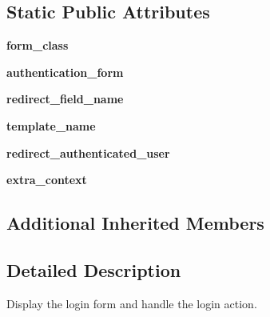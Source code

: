 \subsection*{Static Public Attributes}
\begin{DoxyCompactItemize}
\item 
\mbox{\label{classdjango_1_1contrib_1_1auth_1_1views_1_1_login_view_a97107bf1bbdc16f231a70c8871df00ea}} 
{\bfseries form\+\_\+class}
\item 
\mbox{\label{classdjango_1_1contrib_1_1auth_1_1views_1_1_login_view_a51928766c8e97abc4a82af82711fc81f}} 
{\bfseries authentication\+\_\+form}
\item 
\mbox{\label{classdjango_1_1contrib_1_1auth_1_1views_1_1_login_view_a699c8d982f292bc69a019241a828a9b0}} 
{\bfseries redirect\+\_\+field\+\_\+name}
\item 
\mbox{\label{classdjango_1_1contrib_1_1auth_1_1views_1_1_login_view_afae62f3a18cf0cc321d0d20778a044fb}} 
{\bfseries template\+\_\+name}
\item 
\mbox{\label{classdjango_1_1contrib_1_1auth_1_1views_1_1_login_view_a4b18775121675d6dddba399738c1a508}} 
{\bfseries redirect\+\_\+authenticated\+\_\+user}
\item 
\mbox{\label{classdjango_1_1contrib_1_1auth_1_1views_1_1_login_view_a86d85d7f64f6954f9ebafc687e4f2641}} 
{\bfseries extra\+\_\+context}
\end{DoxyCompactItemize}
\subsection*{Additional Inherited Members}


\subsection{Detailed Description}
\begin{DoxyVerb}Display the login form and handle the login action.
\end{DoxyVerb}
 

